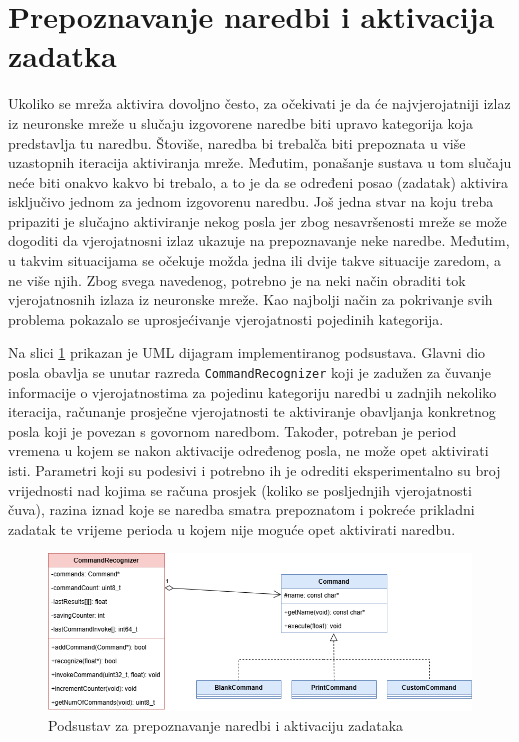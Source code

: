 \section{Prepoznavanje naredbi i aktivacija zadatka}

Ukoliko se mreža aktivira dovoljno često, za očekivati je da će najvjerojatniji izlaz iz 
neuronske mreže u slučaju izgovorene naredbe biti upravo kategorija koja predstavlja tu naredbu. 
Štoviše, naredba bi trebalča biti prepoznata u više uzastopnih iteracija aktiviranja mreže.
Međutim, ponašanje sustava u tom slučaju neće biti onakvo kakvo bi trebalo, a to je da se
određeni posao (zadatak) aktivira isključivo jednom za jednom izgovorenu naredbu. 
Još jedna stvar na koju treba pripaziti je slučajno aktiviranje nekog posla jer zbog
nesavršenosti mreže se može dogoditi da vjerojatnosni izlaz ukazuje na prepoznavanje neke
naredbe. Međutim, u takvim situacijama se očekuje možda jedna ili dvije takve situacije zaredom,
a ne više njih. Zbog svega navedenog, potrebno je na neki način obraditi tok vjerojatnosnih
izlaza iz neuronske mreže. Kao najbolji način za pokrivanje svih problema pokazalo se 
uprosjećivanje vjerojatnosti pojedinih kategorija. 

Na slici \ref{pic:uml} prikazan je UML dijagram implementiranog podsustava. Glavni dio posla
obavlja se unutar razreda \texttt{CommandRecognizer} koji je zadužen za čuvanje informacije
o vjerojatnostima za pojedinu kategoriju naredbi u zadnjih nekoliko iteracija, računanje
prosječne vjerojatnosti te aktiviranje obavljanja konkretnog posla koji je povezan s govornom
naredbom. Također, potreban je period vremena u kojem se nakon aktivacije određenog
posla, ne može opet aktivirati isti. Parametri koji su podesivi i potrebno ih je odrediti 
eksperimentalno su broj vrijednosti nad kojima se računa prosjek (koliko se posljednjih
vjerojatnosti čuva), razina iznad koje se naredba smatra prepoznatom i pokreće prikladni zadatak
te vrijeme perioda u kojem nije moguće opet aktivirati naredbu. 

\begin{figure}[htb]
    \centering
    \includegraphics[width=0.8\linewidth]{Chapters/struktura_sustava/prepoznavanje_naredbi/commands.png} 
    \caption{Podsustav za prepoznavanje naredbi i aktivaciju zadataka\cite{flowchart}}
    \label{pic:uml}
\end{figure}

